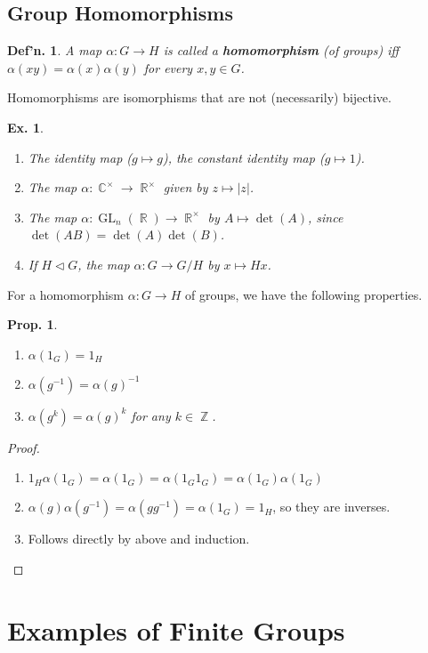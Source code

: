 \documentclass[12pt, a4paper]{book}
\DeclareMathOperator{\Z}{\mathbb{Z}}
\DeclareMathOperator{\R}{\mathbb{R}}
\DeclareMathOperator{\C}{\mathbb{C}}
\DeclareMathOperator{\GL}{GL}
\newtheorem{definition}[theorem]{Def'n.}
\newtheorem{proposition}[theorem]{Prop.}
\newtheorem{example}[theorem]{Ex.}
\theoremstyle{nonumberplain}
\newtheorem{proof}{Proof}
\begin{document}
\subsection{Group Homomorphisms}
\begin{definition}
    A map $\alpha:G\to H$ is called a \textbf{homomorphism} (of groups) iff $\alpha(xy)=\alpha(x)\alpha(y)$ for every $x,y\in G$.
\end{definition}
Homomorphisms are isomorphisms that are not (necessarily) bijective.
\begin{example}
    \begin{enumerate}
        \item The identity map ($g\mapsto g$), the constant identity map ($g\mapsto 1$).
        \item The map $\alpha:\C^\times\to\R^\times$ given by $z\mapsto|z|$.
        \item The map $\alpha:\GL_n(\R)\to\R^\times$ by $A\mapsto\det(A)$, since $\det(AB)=\det(A)\det(B)$.
        \item If $H\triangleleft G$, the map $\alpha:G\to G/H$ by $x\mapsto Hx$.
    \end{enumerate}
\end{example}
For a homomorphism $\alpha:G\to H$ of groups, we have the following properties.
\begin{proposition}
    \begin{enumerate}
        \item $\alpha(1_G)=1_H$
        \item $\alpha(g^{-1})=\alpha(g)^{-1}$
        \item $\alpha(g^k)=\alpha(g)^k$ for any $k\in\Z$.
    \end{enumerate}
\end{proposition}
\begin{proof}
    \begin{enumerate}
        \item $1_H\alpha(1_G)=\alpha(1_G)=\alpha(1_G1_G)=\alpha(1_G)\alpha(1_G)$
        \item $\alpha(g)\alpha(g^{-1})=\alpha(gg^{-1})=\alpha(1_G)=1_H$, so they are inverses.
        \item Follows directly by above and induction.
    \end{enumerate}
\end{proof}
\section{Examples of Finite Groups}
\end{document}
